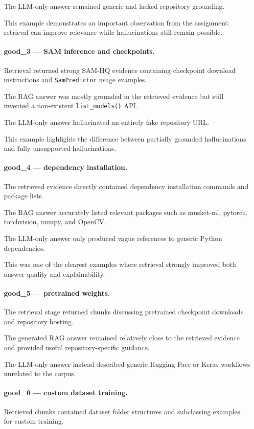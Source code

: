 \documentclass[11pt,a4paper]{article}
\begin{document}
The LLM-only answer remained generic and lacked repository grounding.

This example demonstrates an important observation from the assignment: retrieval can improve relevance while hallucinations still remain possible.

\paragraph{good\_3 --- SAM inference and checkpoints.}
Retrieval returned strong SAM-HQ evidence containing checkpoint download instructions and \texttt{SamPredictor} usage examples.

The RAG answer was mostly grounded in the retrieved evidence but still invented a non-existent \texttt{list\_models()} API.

The LLM-only answer hallucinated an entirely fake repository URL.

This example highlights the difference between partially grounded hallucinations and fully unsupported hallucinations.

\paragraph{good\_4 --- dependency installation.}
The retrieved evidence directly contained dependency installation commands and package lists.

The RAG answer accurately listed relevant packages such as musket-ml, pytorch, torchvision, numpy, and OpenCV.

The LLM-only answer only produced vague references to generic Python dependencies.

This was one of the clearest examples where retrieval strongly improved both answer quality and explainability.

\paragraph{good\_5 --- pretrained weights.}
The retrieval stage returned chunks discussing pretrained checkpoint downloads and repository hosting.

The generated RAG answer remained relatively close to the retrieved evidence and provided useful repository-specific guidance.

The LLM-only answer instead described generic Hugging Face or Keras workflows unrelated to the corpus.

\paragraph{good\_6 --- custom dataset training.}
Retrieved chunks contained dataset folder structures and subclassing examples for custom training.
\end{document}
